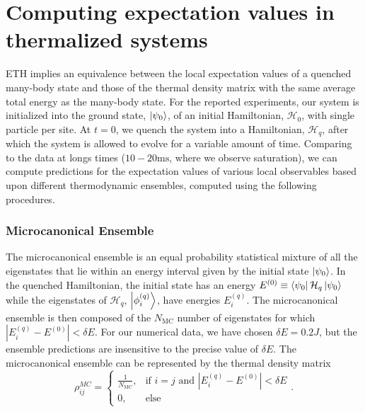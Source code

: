 \chapter{Computing expectation values in thermalized systems}
\label{AppendixA}

ETH implies an equivalence between the local expectation values of a quenched many-body state and those of the thermal density matrix with the same average total energy as the many-body state. For the reported experiments, our system is initialized into the ground
state, $\left|\psi_0\right\rangle$, of an initial Hamiltonian, $\mathcal H_0$, with single particle per site. At $t = 0$, we quench the system into a Hamiltonian, $\mathcal H_q$, after which the system is allowed to evolve for a variable amount of time. Comparing to the data at longs times ($10-20\mathrm{ms}$, where we observe saturation), we can compute predictions for the expectation values of various local observables based upon different thermodynamic ensembles, computed using the following procedures.


\subsection*{Microcanonical Ensemble}
The microcanonical ensemble is an equal probability statistical mixture of all the eigenstates that lie within an energy interval given by the initial state $\left|\psi_0\right\rangle$. In the quenched Hamiltonian, the initial state has an energy $E^{(0)} \equiv \left\langle \psi_0\right| \mathcal H_q \left|\psi_0\right\rangle$ while the eigenstates of $\mathcal H_q$, $\left|\phi^{(q)}_i\right\rangle$, have energies $E_i^{(q)}$. The microcanonical ensemble is then composed of the $N_\text{MC}$ number of eigenstates for which ${|E_i^{(q)} - E^{(0)}| < \delta E}$. For our numerical data, we have chosen $\delta E = 0.2 J$, but the ensemble predictions are insensitive to the precise value of $\delta E$. The microcanonical ensemble can be represented by the thermal density matrix
\begin{equation}
\rho_{ij}^{MC} = 
	\begin{cases} 
		\frac{1}{N_{\text{MC}}}, & \text{if $i = j$ and $|E_i^{(q)} - E^{(0)}| < \delta E$} \\
		0, & \text{else}
	\end{cases}.
\end{equation}

